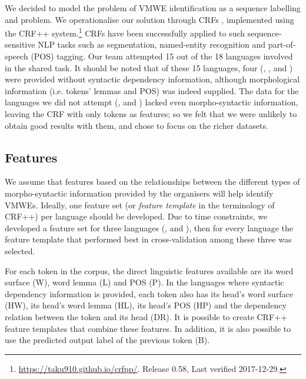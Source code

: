 \documentclass[output=paper,modfonts,nonflat]{langsci/langscibook}
\begin{document}
We decided to model the problem of VMWE identification as a sequence
labelling and  problem. We operationalise our solution
through CRFs \citep{Lafferty2001}, implemented using the
CRF++ system.\footnote{\url{https://taku910.github.io/crfpp/}. Release 0.58, Last verified 2017-12-29.} CRFs have
been successfully applied to such sequence-sensitive NLP tasks such as
segmentation, named-entity
recognition \citep{han2013chinese,han2015chinese} and part-of-speech (POS)
tagging. Our team attempted 15 out of the 18 languages involved in the
shared task.  It should be noted that of these 15 languages, four
(, ,  and ) were provided without syntactic
dependency information, although morphological information
(i.e. tokens' lemmas and POS) was indeed supplied.
The data for the languages we did not attempt (,  and
) lacked even morpho-syntactic information, leaving the CRF
with only tokens as features; so we felt that we were unlikely to
obtain good results with them, and chose to focus on the richer
datasets. 



\subsection{Features}

We assume that features based on the relationships between the
different types of morpho-syntactic information provided by the
organisers will help identify VMWEs. Ideally, one feature set (or
\emph{feature template} in the terminology of CRF++) per language
should be developed. Due to time constraints, we developed a
feature set for three languages (,  and ), then for
every language the feature template that performed best in
cross-validation among these three was selected.

For each token in the corpus, the direct linguistic features available 
are its word surface (W), word lemma (L) and POS (P). In the languages
where syntactic dependency information is provided, each token also
has its head's word surface (HW), its head's word lemma (HL), its
head's POS (HP) and the dependency relation between the token and its
head (DR). It is possible to create CRF++ feature templates that
combine these features. In addition, it is also possible to use the
predicted output label of the previous token (B). 
\end{document}
